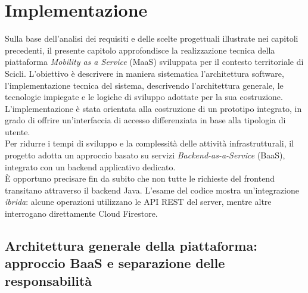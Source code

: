 \chapter{Implementazione}
Sulla base dell'analisi dei requisiti e delle scelte progettuali illustrate nei capitoli precedenti, il presente capitolo approfondisce la realizzazione tecnica della piattaforma \emph{Mobility as a Service} (MaaS) sviluppata per il contesto territoriale di Scicli. L'obiettivo è descrivere in maniera sistematica l'architettura software, l'implementazione tecnica del sistema, descrivendo l'architettura generale, le tecnologie impiegate e le logiche di sviluppo adottate per la sua costruzione.
\\
L'implementazione è stata orientata alla costruzione di un prototipo integrato, in grado di offrire un'interfaccia di accesso differenziata in base alla tipologia di utente. 
\\
Per ridurre i tempi di sviluppo e la complessità delle attività infrastrutturali, il progetto adotta un approccio basato su servizi \emph{Backend-as-a-Service} (BaaS), integrato con un backend applicativo dedicato. 
\\
È opportuno precisare fin da subito che non tutte le richieste del frontend transitano attraverso il backend Java. L'esame del codice mostra un'integrazione \emph{ibrida}: alcune operazioni utilizzano le API REST del server, mentre altre interrogano direttamente Cloud Firestore.

\section{Architettura generale della piattaforma: approccio BaaS e separazione delle responsabilità}

